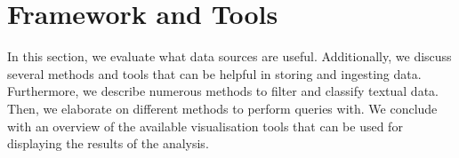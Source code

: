 \section{Framework and Tools}
In this section, we evaluate what data sources are useful. Additionally, we discuss several methods and tools that can be helpful in storing and ingesting data. Furthermore, we describe numerous methods to filter and classify textual data. Then, we elaborate on different methods to perform queries with. We conclude with an overview of the available visualisation tools that can be used for displaying the results of the analysis.







